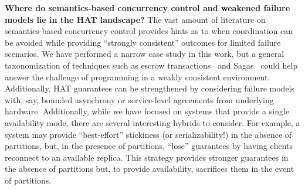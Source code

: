 \textbf{Where do semantics-based concurrency control and weakened
  failure models lie in the HAT landscape?} The vast amount of
literature on semantics-based concurrency control provides hints as to
when coordination can be avoided while providing ``strongly
consistent'' outcomes for limited failure scenarios. We have performed
a narrow case study in this work, but a general taxonomization of
techniques such as escrow transactions~\cite{escrow} and
Sagas~\cite{sagas} could help answer the challenge of programming in a
weakly consistent environment. Additionally, HAT guarantees can be
strengthened by considering failure models with, say, bounded
asynchrony or service-level agreements from underlying
hardware. Additionally, while we have focused on systems that provide
a single availability mode, there are several interesting hybrids to
consider. For example, a system may provide ``best-effort'' stickiness
(or serializability!) in the absence of partitions, but, in the
presence of partitions, ``lose'' guarantees by having clients
reconnect to an available replica. This strategy provides stronger
guarantees in the absence of partitions but, to provide availability,
sacrifices them in the event of partitions.
